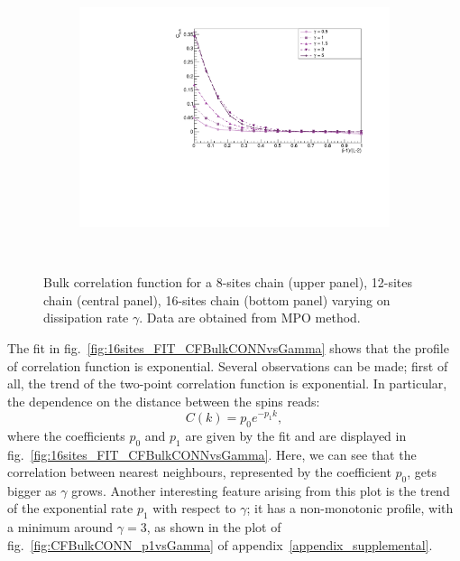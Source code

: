 \begin{figure}[H]
\begin{subfigure}{\columnwidth}
    \includegraphics[scale=0.55]{Figures/16sites/16sites_CFBulkCONNVSgamma.pdf}
    \label{fig:16sites_LMvsGamma}
\end{subfigure}\\
\captionsetup{width=1.\linewidth}
\caption{Bulk correlation function for a 8-sites chain (upper panel), 12-sites chain (central panel), 16-sites chain (bottom panel) varying on dissipation rate $\gamma$. Data are obtained from MPO method.}
\label{fig:BulkCFvsGamma3panelsSizes}
\end{figure}

The fit in fig.~\ref{fig:16sites_FIT_CFBulkCONNvsGamma} shows that the profile of correlation function is exponential. Several observations can be made; first of all, the trend of the two-point correlation function is exponential. In particular, the dependence on the distance between the spins reads:
\begin{equation}
    C(k) = p_0 e^{-p_1 k},
\end{equation}
where the coefficients $p_0$ and $p_1$ are given by the fit and are displayed in fig.~\ref{fig:16sites_FIT_CFBulkCONNvsGamma}. Here, we can see that the correlation between nearest neighbours, represented by the coefficient $p_0$, gets bigger as $\gamma$ grows. Another interesting feature arising from this plot is the trend of the exponential rate $p_1$ with respect to $\gamma$; it has a non-monotonic profile, with a minimum around $\gamma = 3$, as shown in the plot of fig.~\ref{fig:CFBulkCONN_p1vsGamma} of appendix~\ref{appendix_supplemental}. %

